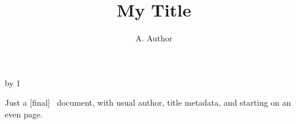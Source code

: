 \documentclass[final]{ltugboat}
\author{A. Author}
\title{My Title}
\begin{document}
\advance{} by 1
\maketitle
Just a [final] \TUB\ document, with usual author, title metadata,
and starting on an even page.
\end{document}
